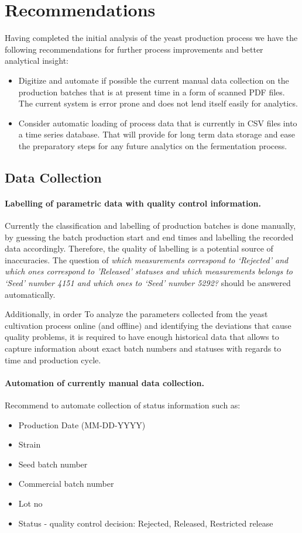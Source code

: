 \section{Recommendations}
Having completed the initial analysis of the yeast production process we have the following recommendations for further process improvements and better analytical insight:

\begin{itemize}
\item Digitize and automate if possible the current manual data collection on the production batches that is at present time in a form of scanned PDF files. The current system is error prone and does not lend itself easily for analytics.
\item Consider automatic loading of process data that is currently in CSV files into a time series database. That will provide for long term data storage and ease the preparatory steps for any future analytics on the fermentation process.
\end{itemize}

\subsection{Data Collection}
\paragraph{Labelling of parametric data with quality control information.}
Currently the classification and labelling of production batches is done manually, by guessing the batch production start and end times and labelling the recorded data accordingly. Therefore, the quality of labelling is a potential source of inaccuracies. The question of \emph{which measurements correspond to ‘Rejected’ and which ones correspond to ’Released’ statuses and  which measurements belongs to ‘Seed’ number 4151 and which ones to ‘Seed’ number 5292?} should be answered automatically.

Additionally, in order To analyze the parameters collected from the yeast cultivation process online (and offline) and identifying the deviations that cause quality problems, it is required to have enough historical data that allows to capture information about exact batch numbers and statuses with regards to time and production cycle. 

\paragraph{Automation of currently manual data collection.}
Recommend to automate collection of status information such as:
\begin{itemize}
    \item Production Date (MM-DD-YYYY)
    \item Strain
    \item Seed batch number
    \item Commercial batch number
    \item Lot no
    \item Status - quality control decision: Rejected, Released, Restricted release
\end{itemize}

